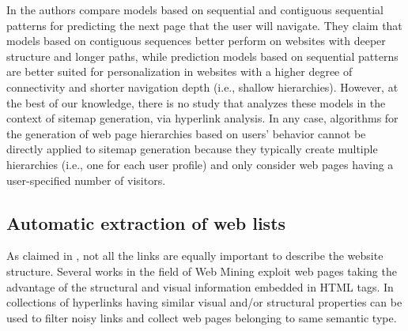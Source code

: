 
In \cite{Nakagawa:2003} the authors compare models based on sequential and contiguous sequential patterns for predicting the next page that the user will navigate. They claim that models based on contiguous sequences better perform on  websites  with  deeper  structure  and  longer  paths, while prediction models based on sequential patterns are better suited for personalization in websites with a higher degree of connectivity and shorter navigation depth (i.e., shallow  hierarchies).  However,  at the best of  our  knowledge,  there  is no  study  that analyzes these models in  the  context  of  sitemap  generation, via hyperlink analysis. In any case, algorithms for the generation of web page hierarchies based on users' behavior cannot be directly applied to sitemap generation because they typically create multiple hierarchies (i.e., one for each user profile) and only consider web pages having a user-specified number of visitors.

\subsection{Automatic extraction of web lists}
As claimed in \cite{Crescenzi:2005}, not all the links are equally important to describe  the  website  structure.
Several works in the field of Web Mining exploit web pages taking the advantage of the structural and visual information embedded in HTML tags. In \cite{Crescenzi:2005, Lin:2010b, Lanotte:2014} collections of hyperlinks having similar visual and/or structural properties can be used to filter noisy links and collect web pages belonging to same semantic type. 

